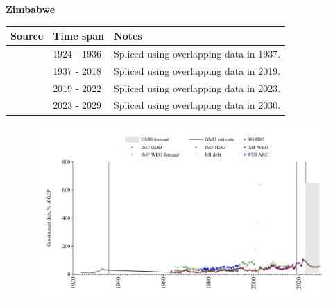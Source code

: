 \documentclass[12pt,a4paper,landscape]{article}
\begin{document}
\begin{adjustbox}{max totalsize={\paperwidth}{\paperheight},center}
\begin{minipage}[t][\textheight][t]{\textwidth}
\vspace*{0.5cm}
{}
\begin{center}
{\Large\bfseries Zimbabwe}
\end{center}
\vspace{0.5cm}
\begin{table}[H]
\centering
\small
\begin{tabular}{|l|l|l|}
\hline
\textbf{Source} & \textbf{Time span} & \textbf{Notes} \\
\hline
\rowcolor{white}\cite{RR_debt}& 1924 - 1936 &Spliced using overlapping data in 1937.\\
\rowcolor{lightgray}\cite{IMF_GDD}& 1937 - 2018 &Spliced using overlapping data in 2019.\\
\rowcolor{white}\cite{IMF_WEO}& 2019 - 2022 &Spliced using overlapping data in 2023.\\
\rowcolor{lightgray}\cite{IMF_WEO_forecast}& 2023 - 2029 &Spliced using overlapping data in 2030.\\
\hline
\end{tabular}
\end{table}
\begin{figure}[H]
\centering
\includegraphics[width=\textwidth,height=0.6\textheight,keepaspectratio]{graphs/ZWE_govdebt_GDP.pdf}
\end{figure}
\end{minipage}
\end{adjustbox}
\end{document}
